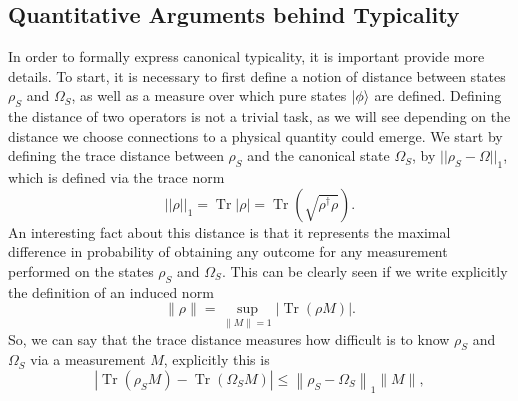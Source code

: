 \subsection{Quantitative Arguments behind Typicality}
In order to formally express canonical typicality, it is important provide more details. To start, it is necessary to first define a notion of distance between states $\rho_S$ and $\Omega_S$, as well as a measure over which pure states $\mathinner{|{\phi}\rangle}$ are defined. Defining the distance of two operators is not a trivial task, as we will see depending on the distance we choose connections to a physical quantity could emerge. We start by defining the trace distance between $\rho_S$ and the canonical state $\Omega_S$, by  $||\rho_S-\Omega||_1$, which is defined via the trace norm
\begin{equation}
||\rho||_1=\operatorname{Tr}|\rho|=\operatorname{Tr}\left(\sqrt{\rho^{\dagger} \rho}\right).
\label{CH1:Trace_distance}
\end{equation}
\indent An interesting fact about this distance is that it represents the maximal difference in probability of obtaining any outcome for any measurement performed on the states $\rho_S$ and $\Omega_S$. This can be clearly seen if we write explicitly the definition of an induced norm
\begin{equation}
\|\rho\| = \sup_{\|M\|=1} |\operatorname{Tr}(\rho M)|.
\end{equation}
\indent So, we can say that the trace distance measures how difficult is to know $\rho_S$ and $\Omega_S$ via a measurement $M$, explicitly this is
\begin{equation}
\left|\operatorname{Tr}\left(\rho_{S} M\right)-\operatorname{Tr}\left(\Omega_{S} M\right)\right| \leq\left\|\rho_{S}-\Omega_{S}\right\|_{1}\|M\|,
\label{CH1:inequality1_tipicality}
\end{equation}

